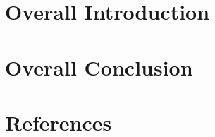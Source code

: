\documentclass[11pt,a4paper]{article}
\begin{document}
\clearpage


\section{Overall Introduction}

\newpage

\newpage

\newpage

\newpage


\section{Overall Conclusion}




\section{References}
\printbibliography[heading=none]
\end{document}
